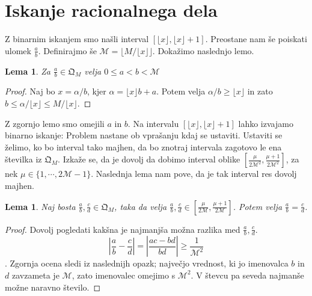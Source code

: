 \documentclass[a4paper,14pt]{article}
\theoremstyle{definition} %
\theoremstyle{plain} %
\newtheorem{lema}[definition]{Lema}
\begin{document}
\section{Iskanje racionalnega dela}

Z binarnim iskanjem smo našli interval $[\lfloor x \rfloor, \lfloor x \rfloor +1]$. 
Preostane nam še poiskati ulomek $\frac{a}{b}$.
Definirajmo še $\mathcal{M} = \lfloor M/ \lfloor x \rfloor \rfloor$.
Dokažimo naslednjo lemo.
\begin{lema}
    Za $\frac{a}{b} \in \mathfrak{Q}_M$ velja $0 \leq a < b < \mathcal{M}$
\end{lema}
\begin{proof}
    Naj bo $x = \alpha/b$, kjer $\alpha = \lfloor x \rfloor b + a$. Potem velja $\alpha / b \geq \lfloor x \rfloor$ in zato 
    $b \leq \alpha / \lfloor x \rfloor \leq M / \lfloor x \rfloor$.
\end{proof}
Z zgornjo lemo smo omejili $a$ in $b$. Na intervalu  $[\lfloor x \rfloor, \lfloor x \rfloor +1]$ lahko izvajamo 
binarno iskanje: Problem nastane ob vprašanju kdaj se ustaviti. Ustaviti se želimo, ko bo interval tako majhen, 
da bo znotraj intervala zagotovo le ena številka iz $\mathfrak{Q}_M$. 
Izkaže se, da je dovolj da dobimo interval oblike $\left[\frac{\mu}{2\mathcal{M}^2}, \frac{\mu +1}{2\mathcal{M}^2}\right]$, za nek $\mu \in \{1,\cdots,2\mathcal{M}-1\}$. 
Naslednja lema nam pove, da je tak interval res dovolj majhen.
\begin{lema}
    Naj bosta $\frac{a}{b},\frac{c}{d} \in \mathfrak{Q}_M$, taka da velja $\frac{a}{b},\frac{c}{d} \in \left[\frac{\mu}{2\mathcal{M}}, \frac{\mu +1}{2\mathcal{M}}\right]$. 
    Potem velja  $\frac{a}{b} = \frac{c}{d}$.
\end{lema}
\begin{proof}
    Dovolj pogledati kakšna je najmanjša možna razlika med  $\frac{a}{b},\frac{c}{d}$.
    $$ \left| \frac{a}{b}-\frac{c}{d} \right| = \left| \frac{ac-bd}{bd} \right| \geq \frac{1}{\mathcal{M}^2}$$.
    Zgornja ocena sledi iz naslednijh opazk; največjo vrednost, ki jo imenovalca $b$ in $d$ zavzameta je $\mathcal{M}$, zato imenovalec omejimo s $\mathcal{M}^2$.
    V števcu pa seveda najmanše možne naravno število.
\end{proof}
\end{document}
